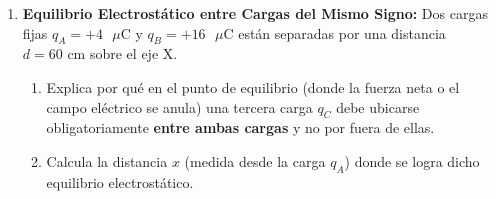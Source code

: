 \documentclass[11pt, letterpaper]{article}
\newif\ifshowanswers
\newcommand{\answer}[1]{ 
	\ifshowanswers 
	\par\vspace{0.15cm} 
	\begin{tcolorbox}[colback=blue!5!white, colframe=blue!60!white, arc=1mm, boxrule=0.5pt, title=\textbf{\footnotesize SOLUCIÓN PASO A PASO (DOCENTE)}] 
		\color{blue!80!black}\footnotesize #1 
	\end{tcolorbox} 
	\par\vspace{0.15cm} 
	\else 
	\par\vspace{0.3cm} 
	\fi 
}
\begin{document}
\begin{enumerate}[leftmargin=*, itemsep=0.8cm]
		\item \textbf{ Equilibrio Electrostático entre Cargas del Mismo Signo:} 
		Dos cargas fijas $q_A = +4\text{ }\mu\text{C}$ y $q_B = +16\text{ }\mu\text{C}$ están separadas por una distancia $d = 60\text{ cm}$ sobre el eje X. 
		\begin{enumerate}[label=\alph*), itemsep=0.2cm] 
			\item Explica por qué en el punto de equilibrio (donde la fuerza neta o el campo eléctrico se anula) una tercera carga $q_C$ debe ubicarse obligatoriamente \textbf{entre ambas cargas} y no por fuera de ellas. 
			\item Calcula la distancia $x$ (medida desde la carga $q_A$) donde se logra dicho equilibrio electrostático. 
		\end{enumerate} 
		\answer{ 
			\textbf{a) Justificación de la posición interlineal:} 
			Como ambas cargas $q_A$ y $q_B$ tienen el mismo signo ($+$), los campos eléctricos o fuerzas producidas sobre $q_C$ solo tienen sentidos opuestos en los puntos intermedios comprendidos entre $q_A$ y $q_B$. Por fuera de ellas, ambas fuerzas apuntan en el mismo sentido y nunca se cancelarían.\\[0.1cm] 
			\textbf{b) Cálculo algebraico de la distancia $x$:} 
			Sea $x$ la distancia desde $q_A$, entonces la distancia desde $q_B$ es $(0,60 - x)$. 
			\[ F_{AC} = F_{BC} \implies k \frac{q_A \cdot |q_C|}{x^2} = k \frac{q_B \cdot |q_C|}{(0,60 - x)^2} \implies \frac{q_A}{x^2} = \frac{q_B}{(0,60 - x)^2} \] 
			Reemplazando $q_A = 4$ y $q_B = 16$: 
			\[ \frac{4}{x^2} = \frac{16}{(0,60 - x)^2} \] 
			Aplicando raíz cuadrada a ambos lados: 
			\[ \frac{2}{x} = \frac{4}{0,60 - x} \implies 2(0,60 - x) = 4x \implies 1,20 - 2x = 4x \implies 6x = 1,20 \] 
			\[ x = \frac{1,20}{6} = \mathbf{0,20\text{ m}} = \mathbf{20\text{ cm}} \quad \text{(medidos desde la carga } q_A) \] 
		} 
		

\end{enumerate}
\end{document}
